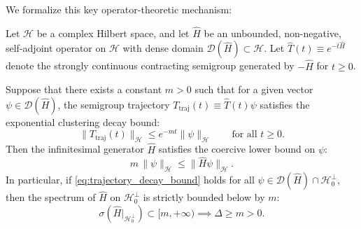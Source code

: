 We formalize this key operator-theoretic mechanism:

\begin{theorem}
\label{thm:semigroup_derivative_engine}
Let $\mathcal{H}$ be a complex Hilbert space, and let $\hat{H}$ be an unbounded, non-negative, self-adjoint operator on $\mathcal{H}$ with dense domain $\mathcal{D}(\hat{H}) \subset \mathcal{H}$. Let $\hat{T}(t) \equiv e^{-t \hat{H}}$ denote the strongly continuous contracting semigroup generated by $-\hat{H}$ for $t \ge 0$.

Suppose that there exists a constant $m > 0$ such that for a given vector $\psi \in \mathcal{D}(\hat{H})$, the semigroup trajectory $T_{\mathrm{traj}}(t) \equiv \hat{T}(t) \psi$ satisfies the exponential clustering decay bound:
\begin{equation}
\label{eq:trajectory_decay_bound}
\|T_{\mathrm{traj}}(t)\|_{\mathcal{H}} \le e^{-m t} \|\psi\|_{\mathcal{H}} \qquad \text{for all } t \ge 0.
\end{equation}
Then the infinitesimal generator $\hat{H}$ satisfies the coercive lower bound on $\psi$:
\begin{equation}
\label{eq:generator_coercive_bound}
m \, \|\psi\|_{\mathcal{H}} \le \|\hat{H} \psi\|_{\mathcal{H}}.
\end{equation}
In particular, if \eqref{eq:trajectory_decay_bound} holds for all $\psi \in \mathcal{D}(\hat{H}) \cap \mathcal{H}_0^\perp$, then the spectrum of $\hat{H}$ on $\mathcal{H}_0^\perp$ is strictly bounded below by $m$:
\begin{equation}
\label{eq:hamiltonian_spectrum_strictly_gapped}
\sigma(\hat{H}|_{\mathcal{H}_0^\perp}) \subset [m, +\infty) \implies \Delta \ge m > 0.
\end{equation}
\end{theorem}

